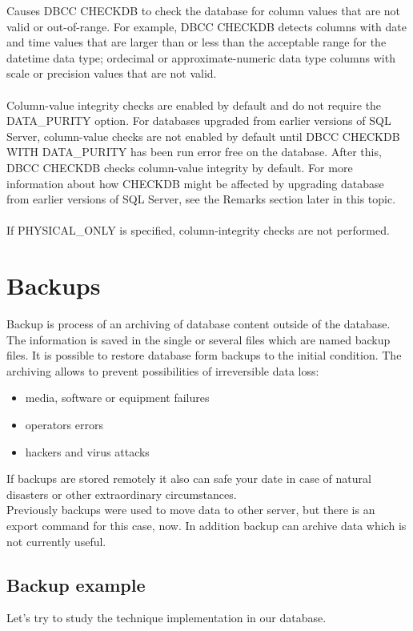 \documentclass[english]{article}
\begin{document}
Causes DBCC CHECKDB to check the database for column values that are not valid or out-of-range. For example, DBCC CHECKDB detects columns with date and time values that are larger than or less than the acceptable range for the datetime data type; ordecimal or approximate-numeric data type columns with scale or precision values that are not valid.\\\\
Column-value integrity checks are enabled by default and do not require the DATA\_PURITY option. For databases upgraded from earlier versions of SQL Server, column-value checks are not enabled by default until DBCC CHECKDB WITH DATA\_PURITY has been run error free on the database. After this, DBCC CHECKDB checks column-value integrity by default. For more information about how CHECKDB might be affected by upgrading database from earlier versions of SQL Server, see the Remarks section later in this topic.\\\\
If PHYSICAL\_ONLY is specified, column-integrity checks are not performed.\cite{checkdb}


\section{Backups}
Backup is process of an archiving of database content outside of the database. The information is saved in the single or several files which are named backup files. It is possible to restore database form backups to the initial condition. The archiving allows to prevent possibilities of irreversible data loss:
\begin{itemize}
\item media, software or equipment failures 
\item operators errors
\item hackers and virus attacks
\end{itemize}

If backups are stored remotely it also can safe your date in case of natural disasters or other extraordinary circumstances.\\

Previously backups were used to move data to other server, but there is an export command for this case, now. In addition backup can archive data which is not currently useful. 

\subsection{Backup example}
Let's try to study the technique implementation in our database. 
\end{document}
